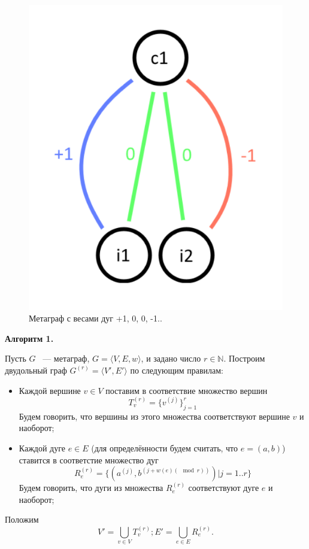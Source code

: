 \documentclass[14pt]{mmcs-article}
\begin{document}
\begin{figure}[H]
    \centering
    \includegraphics[scale=0.4]{Fig_2.png}
    \caption{ Метаграф с весами дуг +1, 0, 0, -1.. }
    \label{image:2}
\end{figure}

\textbf{Алгоритм 1.}

Пусть $G$ ~--- метаграф, $G = \langle V, E, w \rangle$, и задано число $r \in \mathbb{N}$. Построим двудольный граф $G^{(r)} = \langle V', E' \rangle$ по следующим правилам:


\begin{itemize}
    \item Каждой вершине $v \in V$ поставим в соответствие множество вершин
    \[
        T^{(r)}_v = \{ v^{(j)} \}_{j = 1}^r
    \]
    Будем говорить, что вершины из этого множества соответствуют вершине $v$ и наоборот;

    \item Каждой дуге $e \in E$ (для определённости будем считать, что $e = (a, b)$) ставится в соответстие множество дуг
    \[
        R^{(r)}_e = \{ (a^{(j)}, b^{(j + w(e) (\mod{r}))}) | j = 1..r \}
    \]
    Будем говорить, что дуги из множества $R^{(r)}_e$ соответствуют дуге $e$ и наоборот;
\end{itemize}
Положим
\[
    V' = \bigcup_{v \in V} T^{(r)}_v; E' = \bigcup_{e \in E} R^{(r)}_e.
\]
\end{document}
